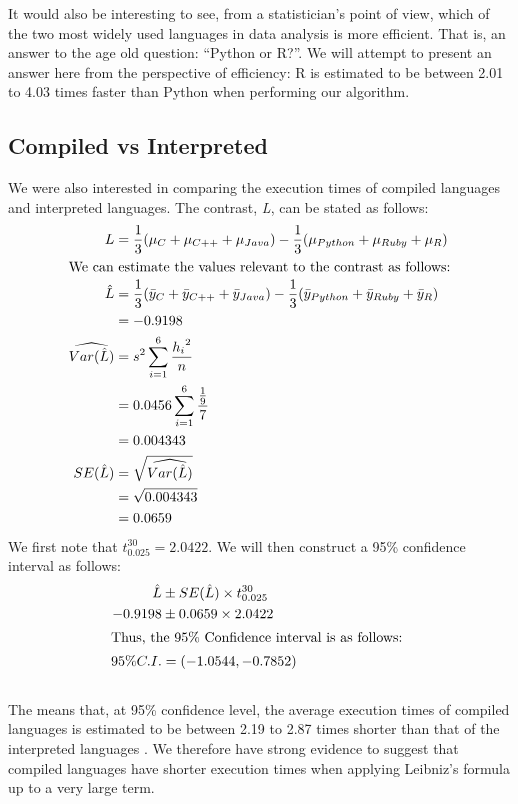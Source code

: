\documentclass[12pt,halfline,a4paper,]{ouparticle}
\begin{document}
It would also be interesting to see, from a statistician's point of
view, which of the two most widely used languages in data analysis is
more efficient. That is, an answer to the age old question: ``Python or
R?''. We will attempt to present an answer here from the perspective of
efficiency: R is estimated to be between 2.01 to 4.03 times faster than
Python when performing our algorithm.

\subsection{Compiled vs Interpreted}\label{compiled-vs-interpreted}

We were also interested in comparing the execution times of compiled
languages and interpreted languages. The contrast, \emph{L}, can be
stated as follows: \begin{align*}
L &= \frac{1}{3} (\mu_C + \mu_{C++} + \mu_{Java}) - \frac{1}{3}(\mu_{Python} + \mu_{Ruby} + \mu_{R})\\
\intertext{We can estimate the values relevant to the contrast as follows:}
\hat{L} &= \frac{1}{3} (\bar{y}_C + \bar{y}_{C++} + \bar{y}_{Java}) - \frac{1}{3}(\bar{y}_{Python} + \bar{y}_{Ruby} + \bar{y}_{R})\\
&= -0.9198 \\
\widehat{Var(\hat{L})} &= s^{2} \sum_{i=1}^{6} \frac{{h_i}^2}{n}\\
&= 0.0456\sum_{i=1}^{6}\frac{\frac{1}{9}}{7}\\
&= 0.004343\\
SE(\hat{L}) &= \sqrt{\widehat{Var(\hat{L})}}\\
 &= \sqrt{0.004343}\\
 &= 0.0659
\end{align*} We first note that \(t_{0.025}^{30} = 2.0422\). We will
then construct a 95\% confidence interval as follows: \begin{align*}
\hat{L}&\pm SE(\hat{L})\times t_{0.025}^{30}\\
-0.9198 &\pm 0.0659 \times 2.0422\\
\intertext{Thus, the 95\% Confidence interval is as follows: }
95\%C.I. &= (-1.0544 ,-0.7852)
\end{align*}\\
The means that, at 95\% confidence level, the average execution times of
compiled languages is estimated to be between 2.19 to 2.87 times shorter
than that of the interpreted languages . We therefore have strong
evidence to suggest that compiled languages have shorter execution times
when applying Leibniz's formula up to a very large term. \newpage
\end{document}
